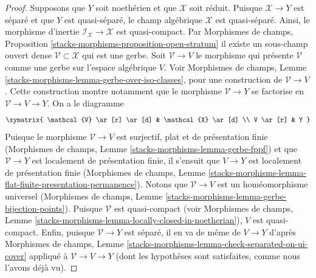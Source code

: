 \begin{proof}
\medskip\noindent
Supposons que $Y$ soit noethérien et que $\mathcal{X}$ soit réduit.
Puisque $\mathcal{X} \to Y$ est séparé et que $Y$ est quasi-séparé,
le champ algébrique $\mathcal{X}$ est quasi-séparé.
Ainsi, le morphisme d'inertie $\mathcal{I}_\mathcal{X} \to \mathcal{X}$
est quasi-compact. Par Morphismes de champs, Proposition
\ref{stacks-morphisms-proposition-open-stratum}
il existe un sous-champ ouvert dense $\mathcal{V} \subset \mathcal{X}$
qui est une gerbe. Soit $\mathcal{V} \to V$ le morphisme
qui présente $\mathcal{V}$ comme une gerbe sur l'espace algébrique $V$.
Voir
Morphismes de champs, Lemme \ref{stacks-morphisms-lemma-gerbe-over-iso-classes},
pour une construction de $\mathcal{V} \to V$.
Cette construction montre notamment que le morphisme
$\mathcal{V} \to Y$ se factorise en $\mathcal{V} \to V \to Y$.
On a le diagramme
$$
\xymatrix{
\mathcal{V} \ar[r] \ar[d] & \mathcal{X} \ar[d] \\
V \ar[r] & Y
}
$$
Puisque le morphisme $\mathcal{V} \to V$ est surjectif, plat et
de présentation finie
(Morphismes de champs, Lemme \ref{stacks-morphisms-lemma-gerbe-fppf})
et que $\mathcal{V} \to Y$ est localement de présentation finie,
il s'ensuit que $V \to Y$ est localement de présentation finie
(Morphismes de champs, Lemme
\ref{stacks-morphisms-lemma-flat-finite-presentation-permanence}).
Notons que $\mathcal{V} \to V$ est un homéomorphisme universel
(Morphismes de champs, Lemme
\ref{stacks-morphisms-lemma-gerbe-bijection-points}).
Puisque $\mathcal{V}$ est quasi-compact (voir
Morphismes de champs, Lemme
\ref{stacks-morphisms-lemma-locally-closed-in-noetherian}),
$V$ est quasi-compact.
Enfin, puisque $\mathcal{V} \to Y$ est séparé, il en va de même
de $V \to Y$ d'après
Morphismes de champs, Lemme
\ref{stacks-morphisms-lemma-check-separated-on-ui-cover}
appliqué à $\mathcal{V} \to V \to Y$
(dont les hypothèses sont satisfaites, comme nous l'avons déjà vu).


\end{proof}
